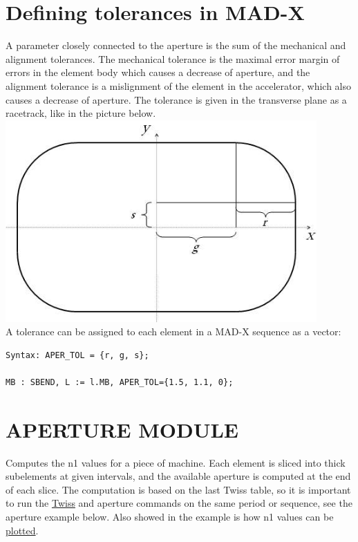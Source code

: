 \section{Defining tolerances in MAD-X}
A parameter closely connected to the aperture is the sum of the
mechanical and alignment tolerances. The mechanical tolerance is the
maximal error margin of errors in the element body which causes a
decrease of aperture, and the alignment tolerance is a mislignment of
the element in the accelerator, which also causes a decrease of
aperture. The tolerance is given in the transverse plane as a racetrack,
like in the picture below. 
\\
\includegraphics[width=450px]{Introduction/tolerance.jpg}
\\ 
A tolerance can be assigned to each element in a MAD-X sequence as a vector: 
\begin{verbatim}
Syntax: APER_TOL = {r, g, s};

MB : SBEND, L := l.MB, APER_TOL={1.5, 1.1, 0};
\end{verbatim}

\section{APERTURE MODULE}
Computes the n1 values for a piece of machine. Each element is sliced
into thick subelements at given intervals, and the available aperture is
computed at the end of each slice. The computation is based on the last
Twiss table, so it is important to run the
\href{../twiss/twiss.html}{Twiss} and aperture commands on the same
period or sequence, see the aperture example below. Also showed in the
example is how n1 values can be \href{../plot/plot.html}{plotted}.   

